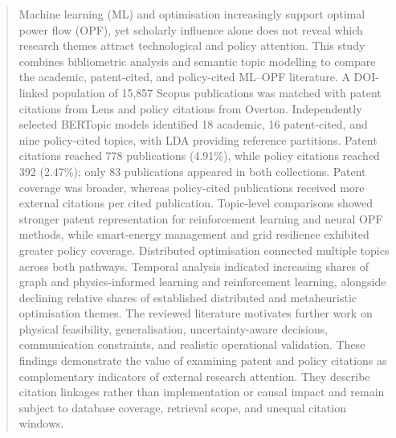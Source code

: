\documentclass[a4paper,fleqn]{cas-sc}
\begin{document}



\begin{abstract}
Machine learning (ML) and optimisation increasingly support optimal power flow (OPF), yet scholarly influence alone does not reveal which research themes attract technological and policy attention. This study combines bibliometric analysis and semantic topic modelling to compare the academic, patent-cited, and policy-cited ML--OPF literature. A DOI-linked population of 15,857 Scopus publications was matched with patent citations from Lens and policy citations from Overton. Independently selected BERTopic models identified 18 academic, 16 patent-cited, and nine policy-cited topics, with LDA providing reference partitions. Patent citations reached 778 publications (4.91\%), while policy citations reached 392 (2.47\%); only 83 publications appeared in both collections. Patent coverage was broader, whereas policy-cited publications received more external citations per cited publication. Topic-level comparisons showed stronger patent representation for reinforcement learning and neural OPF methods, while smart-energy management and grid resilience exhibited greater policy coverage. Distributed optimisation connected multiple topics across both pathways. Temporal analysis indicated increasing shares of graph and physics-informed learning and reinforcement learning, alongside declining relative shares of established distributed and metaheuristic optimisation themes. The reviewed literature motivates further work on physical feasibility, generalisation, uncertainty-aware decisions, communication constraints, and realistic operational validation. These findings demonstrate the value of examining patent and policy citations as complementary indicators of external research attention. They describe citation linkages rather than implementation or causal impact and remain subject to database coverage, retrieval scope, and unequal citation windows.
\end{abstract}
\end{document}
